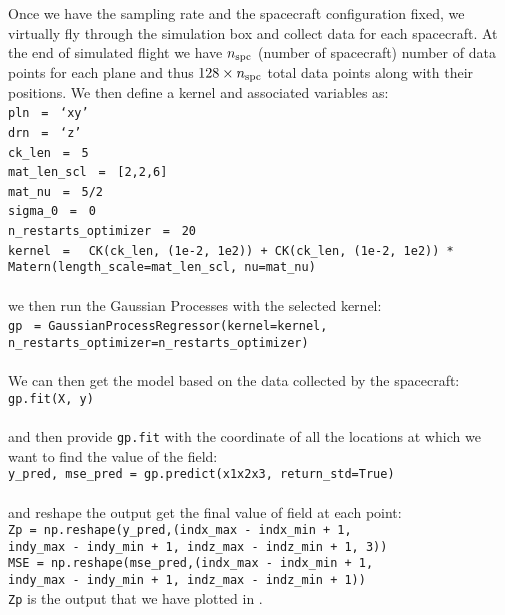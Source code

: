     Once we have the sampling rate and the spacecraft configuration fixed, we virtually fly through
    the simulation box and collect data for each spacecraft. At the end of simulated flight we have
    $n_{\rm spc}$ (number of spacecraft) number of data points for each plane and thus $128 \times
    n_{\rm spc}$ total data points along with their positions. We then define a kernel and
    associated variables as: \\
    \texttt{pln} ~\texttt{=}~ \texttt{`xy'} \\
    \texttt{drn} ~\texttt{=}~ \texttt{`z'} \\
    \texttt{ck\_len} ~\texttt{=}~ \texttt{5} \\
    \texttt{mat\_len\_scl} ~\texttt{=}~ \texttt{[2,2,6]} \\
    \texttt{mat\_nu} ~\texttt{=}~ \texttt{5/2} \\
    \texttt{sigma\_0} ~\texttt{=}~ \texttt{0} \\
    \texttt{n\_restarts\_optimizer} ~\texttt{=}~ \texttt{20} \\
    \texttt{kernel} ~\texttt{=}~ \texttt{ CK(ck\_len, (1e-2, 1e2)) + CK(ck\_len, (1e-2, 1e2)) *} \\
    \indent \indent \texttt{Matern(length\_scale=mat\_len\_scl, nu=mat\_nu)} \\
    \\
    we then run the Gaussian Processes with the selected kernel:\\
    \texttt{gp} ~\texttt{=}~\texttt{GaussianProcessRegressor(kernel=kernel, } \\
    \indent \indent \texttt{n\_restarts\_optimizer=n\_restarts\_optimizer)} \\
    \\
    We can then get the model based on the data collected by the spacecraft:\\
    \texttt{gp.fit(X, y)} \\
    \\
    and then provide \texttt{gp.fit} with the coordinate of all the locations at which we want to
    find the value of the field:\\ 
    \texttt{y\_pred, mse\_pred = gp.predict(x1x2x3, return\_std=True)} \\
    \\
    and reshape the output get the final value of field at each point:\\
    \texttt{Zp = np.reshape(y\_pred,(indx\_max - indx\_min + 1,}\\
    \indent \texttt{indy\_max - indy\_min + 1, indz\_max - indz\_min + 1, 3))} \\
    \texttt{MSE = np.reshape(mse\_pred,(indx\_max - indx\_min + 1,} \\
    \indent \texttt{indy\_max - indy\_min + 1, indz\_max - indz\_min + 1))} \\

    \texttt{Zp} is the output that we have plotted in .